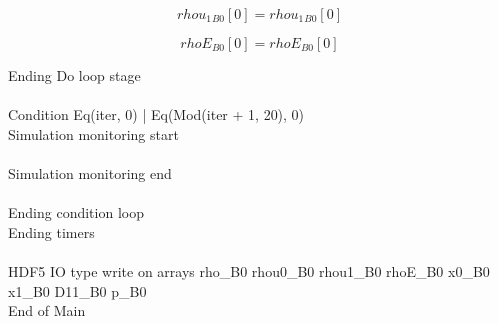 \documentclass{article}
\begin{document}
\begin{dmath}{rhou_{1}{_{B0}}}[{0}] = {rhou_{1}{_{B0}}}[{0}]\end{dmath}

\begin{dmath}{rhoE{_{B0}}}[{0}] = {rhoE{_{B0}}}[{0}]\end{dmath}

\noindent Ending Do loop stage\\
\\\noindent Condition Eq(iter, 0) | Eq(Mod(iter + 1, 20), 0)\\\noindent Simulation monitoring start\\
\\\noindent Simulation monitoring end\\
\\\noindent Ending condition loop %
\\\noindent Ending timers\\
\\\noindent HDF5 IO type write on arrays rho_B0 rhou0_B0 rhou1_B0 rhoE_B0 x0_B0 x1_B0 D11_B0 p_B0\\\noindent End of Main\\
\end{document}
